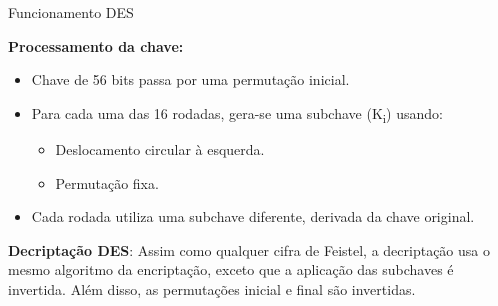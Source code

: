\begin{frame}{Funcionamento DES}




    \vspace{0.3cm}
    \textbf{Processamento da chave:}
    \begin{itemize}
        \item Chave de 56 bits passa por uma permutação inicial.
        \item Para cada uma das 16 rodadas, gera-se uma subchave (K\textsubscript{i}) usando:
            \begin{itemize}
                \item Deslocamento circular à esquerda.
                \item Permutação fixa.
            \end{itemize}
        \item Cada rodada utiliza uma subchave diferente, derivada da chave original.
    \end{itemize}

\textbf{Decriptação DES}:
Assim como qualquer cifra de Feistel, a decriptação usa o mesmo algoritmo da encriptação, exceto que a
aplicação das subchaves é invertida. Além disso, as permutações inicial e final são invertidas.
\end{frame}

